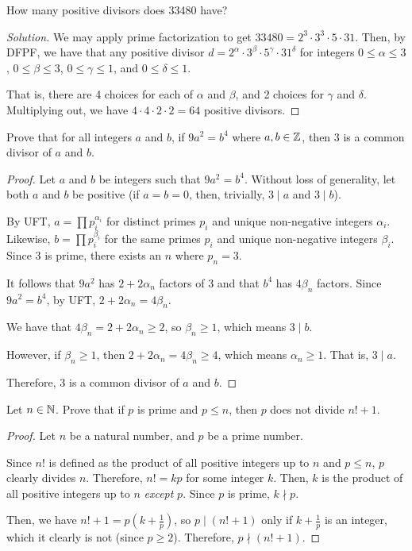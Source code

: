 \question How many positive divisors does 33480 have?
\begin{proof}[Solution]
  We may apply prime factorization to get $33480=2^3\cdot3^3\cdot5\cdot31$.
  Then, by DFPF, we have that any positive divisor $d=2^\alpha\cdot3^\beta\cdot5^\gamma\cdot31^\delta$
  for integers $0\leq\alpha\leq3$, $0\leq\beta\leq3$, $0\leq\gamma\leq1$, and $0\leq\delta\leq1$.

  That is, there are 4 choices for each of $\alpha$ and $\beta$, and 2 choices for $\gamma$ and $\delta$.
  Multiplying out, we have $4\cdot4\cdot2\cdot2=64$ positive divisors.
\end{proof}


\question Prove that for all integers $a$ and $b$,
if $9a^2 = b^4$ where $a,b\in\mathbb{Z}$, then 3 is a common divisor of $a$ and $b$.
\begin{proof}
  Let $a$ and $b$ be integers such that $9a^2=b^4$.
  Without loss of generality, let both $a$ and $b$ be positive
  (if $a=b=0$, then, trivially, $3 \mid a$ and $3 \mid b$).

  By UFT, $a=\prod p_i^{\alpha_i}$ for distinct primes $p_i$ and unique non-negative integers $\alpha_i$.
  Likewise, $b=\prod p_i^{\beta_i}$ for the same primes $p_i$ and unique non-negative integers $\beta_i$.
  Since 3 is prime, there exists an $n$ where $p_n=3$.

  It follows that $9a^2$ has $2+2\alpha_n$ factors of 3 and that $b^4$ has $4\beta_n$ factors.
  Since $9a^2=b^4$, by UFT, $2+2\alpha_n=4\beta_n$.

  We have that $4\beta_n = 2+2\alpha_n \geq 2$, so $\beta_n \geq 1$, which means $3 \mid b$.

  However, if $\beta_n \geq 1$, then $2+2\alpha_n = 4\beta_n \geq 4$, which means $\alpha_n \geq 1$.
  That is, $3 \mid a$.

  Therefore, 3 is a common divisor of $a$ and $b$.
\end{proof}


\question Let $n\in\mathbb{N}$. Prove that if $p$ is prime and $p \leq n$, then $p$ does not divide $n! + 1$.
\begin{proof}
  Let $n$ be a natural number, and $p$ be a prime number.

  Since $n!$ is defined as the product of all positive integers up to $n$ and $p \leq n$, $p$ clearly divides $n$.
  Therefore, $n! = kp$ for some integer $k$.
  Then, $k$ is the product of all positive integers up to $n$ \emph{except} $p$.
  Since $p$ is prime, $k \nmid p$.

  Then, we have $n!+1 = p(k+\frac{1}{p})$, so $p \mid (n!+1)$ only if $k+\frac{1}{p}$ is an integer,
  which it clearly is not (since $p \geq 2$).
  Therefore, $p \nmid (n!+1)$.
\end{proof}


